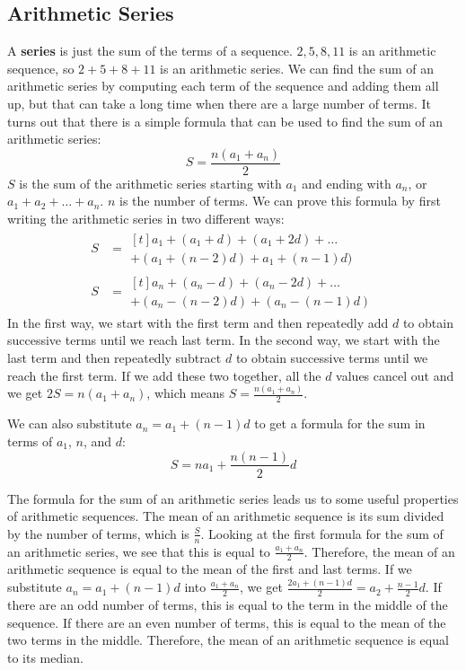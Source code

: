 \documentclass[twocolumn]{article}
\begin{document}
    \subsection*{Arithmetic Series}
    A \textbf{series} is just the sum of the terms of a sequence. $2, 5, 8,
    11$ is an arithmetic sequence, so $2 + 5 + 8 + 11$ is an arithmetic
    series. We can find the sum of an arithmetic series by computing each
    term of the sequence and adding them all up, but that can take a long
    time when there are a large number of terms. It turns out that there is
    a simple formula that can be used to find the sum of an arithmetic
    series:
    \[S = \frac{n(a_1 + a_n)}{2}\] $S$ is the sum of the arithmetic series
    starting with $a_1$ and ending with $a_n$, or $a_1 + a_2 + \dots + a_n$.
    $n$ is the number of terms. We can prove this formula by first writing
    the arithmetic series in two different ways:
    \begin{align*}
        S &= \begin{multlined}[t]
            a_1 + (a_1 + d) + (a_1 + 2d) + \dots \\
            + (a_1 + (n - 2)d) + a_1 + (n - 1)d)
        \end{multlined} \\
        S &= \begin{multlined}[t]
            a_n + (a_n - d) + (a_n - 2d) + \dots \\
            + (a_n - (n - 2)d) + (a_n - (n - 1)d)
        \end{multlined}
    \end{align*}
    In the first way, we start with the first term and then repeatedly add
    $d$ to obtain successive terms until we reach last term. In the second
    way, we start with the last term and then repeatedly subtract $d$ to
    obtain successive terms until we reach the first term. If we add these
    two together, all the $d$ values cancel out and we get $2S = n(a_1 +
    a_n)$, which means $S = \frac{n(a_1 + a_n)}{2}$.

    We can also substitute $a_n = a_1 + (n - 1)d$ to get a formula for the
    sum in terms of $a_1$, $n$, and $d$:
    \[S = na_1 + \frac{n(n - 1)}{2}d\]

    The formula for the sum of an arithmetic series leads us to some useful
    properties of arithmetic sequences.  The mean of an arithmetic sequence
    is its sum divided by the number of terms, which is $\frac{S}{n}$.
    Looking at the first formula for the sum of an arithmetic series, we see
    that this is equal to $\frac{a_1 + a_n}{2}$. Therefore, the mean of an
    arithmetic sequence is equal to the mean of the first and last terms. If
    we substitute $a_n = a_1 + (n - 1)d$ into $\frac{a_1 + a_n}{2}$, we get
    $\frac{2a_1 + (n - 1)d}{2} = a_2 + \frac{n - 1}{2}d$. If there are an
    odd number of terms, this is equal to the term in the middle of the
    sequence. If there are an even number of terms, this is equal to the
    mean of the two terms in the middle. Therefore, the mean of an
    arithmetic sequence is equal to its median.
\end{document}

